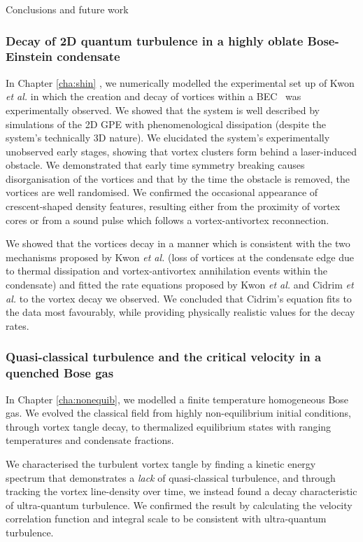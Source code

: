 \begin{chapter}{\label{cha:conc}Conclusions and future work}
\subsubsection{Decay of 2D quantum turbulence in a highly oblate Bose-Einstein condensate}
In Chapter \ref{cha:shin} , we numerically modelled the experimental set up of Kwon {\it et al.} in which the creation and decay of vortices within a BEC~\citep{kwon_moon_14} was experimentally observed. We showed that the system is well described by simulations of the 2D GPE with phenomenological dissipation (despite the system's technically 3D nature). We elucidated the system's experimentally unobserved early stages, showing that vortex clusters form behind a laser-induced obstacle. We demonstrated that early time symmetry breaking causes disorganisation of the vortices and that by the time the obstacle is removed, the vortices are well randomised. We confirmed the occasional appearance of crescent-shaped density features, resulting either from the proximity of vortex cores or from a sound pulse which follows a vortex-antivortex reconnection.

We showed that the vortices decay in a manner which is consistent with the two mechanisms proposed by Kwon {\it et al.} (loss of vortices at the condensate edge due to thermal dissipation and vortex-antivortex annihilation events within the condensate) and fitted the rate equations proposed by Kwon {\it et al.} and Cidrim {\it et al.} to the vortex decay we observed. We concluded that Cidrim's equation fits to the data most favourably, while providing physically realistic values for the decay rates.

\subsubsection{Quasi-classical turbulence and the critical velocity in a quenched Bose gas}
In Chapter \ref{cha:nonequib}, we modelled a finite temperature homogeneous Bose gas. We evolved the classical field from highly non-equilibrium initial conditions, through vortex tangle decay, to thermalized equilibrium states with ranging temperatures and condensate fractions.

We characterised the turbulent vortex tangle by finding a kinetic energy spectrum that demonstrates a {\it lack} of quasi-classical turbulence, and through tracking the vortex line-density over time, we instead found a decay characteristic of ultra-quantum turbulence. We confirmed the result by calculating the velocity correlation function and integral scale to be consistent with ultra-quantum turbulence.


\end{chapter}
